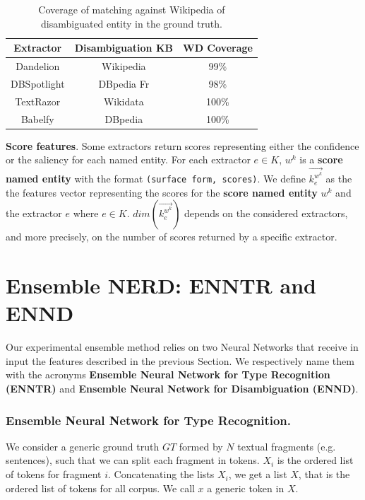 \documentclass{llncs}
\begin{document}
\begin{table}
\centering
\label{tab:qmatch}
\begin{tabular}{|c|c|c|}
\hline
\textbf{Extractor} & \textbf{Disambiguation KB} & \textbf{WD Coverage} \\ \hline
Dandelion    & Wikipedia   & 99\%     \\ \hline
DBSpotlight  & DBpedia Fr  & 98\%     \\ \hline
TextRazor    & Wikidata    & 100\%    \\ \hline
Babelfy      & DBpedia     & 100\%    \\ \hline
\end{tabular}
\bigskip
\caption{Coverage of matching against Wikipedia of disambiguated entity in the ground truth.}
\end{table}

\textbf{Score features}. Some extractors return scores representing either the confidence or the saliency for each named entity. For each extractor $e \in K$, $w^k$ is a \textbf{score named entity} with the format \texttt{(surface form, scores)}. 
We define $\vec{k^{w^{k}}_{e}}$ as the the features vector representing the scores for the \textbf{score named entity} $w^k$ and the extractor $e$ where $e \in K$.  $dim(\vec{k^{w^{k}}_{e}})$ depends on the considered extractors, and more precisely, on the number of scores returned by a specific extractor.


\section{Ensemble NERD: ENNTR and ENND}
\label{sec:experiment}
Our experimental ensemble method relies on two Neural Networks that receive in input the features described in the previous Section. We respectively name them with the acronyms \textbf{Ensemble Neural Network for Type Recognition (ENNTR)} and \textbf{Ensemble Neural Network for Disambiguation (ENND)}.

\subsubsection{Ensemble Neural Network for Type Recognition.}
We consider a generic ground truth $GT$ formed by $N$ textual fragments (e.g. sentences), such that we can split each fragment in tokens. $X_i$ is the ordered list of tokens for fragment $i$. Concatenating the lists $X_i$, we get a list $X$, that is the ordered list of tokens for all corpus. We call $x$ a generic token in $X$. 
\end{document}
